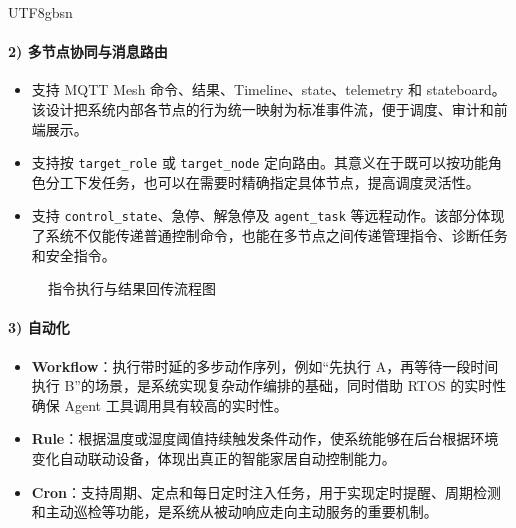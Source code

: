 \documentclass[a4paper,12pt]{article}
\begin{document}
\begin{CJK*}{UTF8}{gbsn}
\paragraph{2) 多节点协同与消息路由}
\begin{itemize}
  \item 支持 MQTT Mesh 命令、结果、Timeline、state、telemetry 和 stateboard。该设计把系统内部各节点的行为统一映射为标准事件流，便于调度、审计和前端展示。
  \item 支持按 \texttt{target\_role} 或 \texttt{target\_node} 定向路由。其意义在于既可以按功能角色分工下发任务，也可以在需要时精确指定具体节点，提高调度灵活性。
  \item 支持 \texttt{control\_state}、急停、解急停及 \texttt{agent\_task} 等远程动作。该部分体现了系统不仅能传递普通控制命令，也能在多节点之间传递管理指令、诊断任务和安全指令。
\end{itemize}

\begin{figure}[htbp]
\centering
{}
\caption{指令执行与结果回传流程图}
\end{figure}

\paragraph{3) 自动化}
\begin{itemize}
  \item \textbf{Workflow}：执行带时延的多步动作序列，例如“先执行 A，再等待一段时间执行 B”的场景，是系统实现复杂动作编排的基础，同时借助 RTOS 的实时性确保 Agent 工具调用具有较高的实时性。
  \item \textbf{Rule}：根据温度或湿度阈值持续触发条件动作，使系统能够在后台根据环境变化自动联动设备，体现出真正的智能家居自动控制能力。
  \item \textbf{Cron}：支持周期、定点和每日定时注入任务，用于实现定时提醒、周期检测和主动巡检等功能，是系统从被动响应走向主动服务的重要机制。
\end{itemize}


\end{CJK*}
\end{document}
